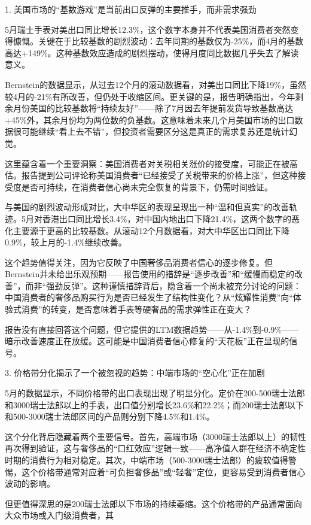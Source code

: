 \documentclass[11pt]{ctexart}
\begin{document}
1. 美国市场的“基数游戏”是当前出口反弹的主要推手，而非需求强劲

5月瑞士手表对美出口同比增长12.3\%，这个数字本身并不代表美国消费者突然变得慷慨。关键在于比较基数的剧烈波动：去年同期的基数仅为-25\%，而4月的基数高达+149\%。这种基数效应造成的剧烈摆动，使得月度同比数据几乎失去了解读意义。

Bernstein的数据显示，从过去12个月的滚动数据看，对美出口同比下降19\%，虽然较4月的-21\%有所改善，但仍处于收缩区间。更关键的是，报告明确指出，今年剩余月份美国的比较基数将“持续友好”——除了7月因去年提前发货导致基数高达+45\%外，其余月份均为两位数的负基数。这意味着未来几个月美国市场的出口数据很可能继续“看上去不错”，但投资者需要区分这是真正的需求复苏还是统计幻觉。

这里蕴含着一个重要洞察：美国消费者对关税相关涨价的接受度，可能正在被高估。报告提到公司评论称美国消费者“已经接受了关税带来的价格上涨”，但这种接受度是否可持续，在消费者信心尚未完全恢复的背景下，仍需时间验证。

与美国的剧烈波动形成对比，大中华区的表现呈现出一种“温和但真实”的改善轨迹。5月对香港出口同比增长3.4\%，对中国内地出口下降21.4\%，这两个数字的恶化主要源于更高的比较基数。从滚动12个月数据看，对大中华区出口同比下降0.9\%，较上月的-1.4\%继续改善。

这个趋势值得关注，因为它反映了中国奢侈品消费者信心的逐步修复。但Bernstein并未给出乐观预期——报告使用的措辞是“逐步改善”和“缓慢而稳定的改善”，而非“强劲反弹”。这种谨慎措辞背后，隐含着一个尚未被充分讨论的问题：中国消费者的奢侈品购买行为是否已经发生了结构性变化？从“炫耀性消费”向“体验式消费”的转变，是否意味着手表等硬奢品的需求弹性正在变大？

报告没有直接回答这个问题，但它提供的LTM数据趋势——从-1.4\%到-0.9\%——暗示改善速度正在放缓。这可能是中国消费者信心修复的“天花板”正在显现的信号。

3. 价格带分化揭示了一个被忽视的趋势：中端市场的“空心化”正在加剧

5月的数据显示，不同价格带的出口表现出现了明显分化。定价在200-500瑞士法郎和3000瑞士法郎以上的手表，出口值分别增长23.6\%和22.2\%；而200瑞士法郎以下和500-3000瑞士法郎区间的产品则分别下降4.5\%和1.4\%。

这个分化背后隐藏着两个重要信号。首先，高端市场（3000瑞士法郎以上）的韧性再次得到验证，这与奢侈品的“口红效应”逻辑一致——高净值人群在经济不确定性时期的消费行为相对稳定。其次，中端市场（500-3000瑞士法郎）的疲软值得警惕，这个价格带通常对应着“可负担奢侈品”或“轻奢”定位，更容易受到消费者信心波动的影响。

但更值得深思的是200瑞士法郎以下市场的持续萎缩。这个价格带的产品通常面向大众市场或入门级消费者，其
\end{document}
